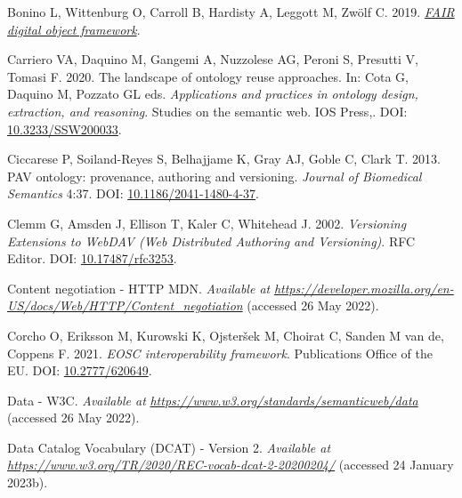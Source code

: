\begin{CSLReferences}{1}{0}
\leavevmode{}%
Bonino L, Wittenburg O, Carroll B, Hardisty A, Leggott M, Zwölf C. 2019. \emph{\href{https://github.com/GEDE-RDA-Europe/GEDE/blob/master/FAIR\%20Digital\%20Objects/FDOF/FAIR\%20Digital\%20Object\%20Framework-v1-02.docx}{FAIR digital object framework}}.

\leavevmode{}%
Carriero VA, Daquino M, Gangemi A, Nuzzolese AG, Peroni S, Presutti V, Tomasi F. 2020. The landscape of ontology reuse approaches. In: Cota G, Daquino M, Pozzato GL eds. \emph{Applications and practices in ontology design, extraction, and reasoning}. Studies on the semantic web. IOS Press,. DOI: \href{https://doi.org/10.3233/SSW200033}{10.3233/SSW200033}.

\leavevmode{}%
Ciccarese P, Soiland-Reyes S, Belhajjame K, Gray AJ, Goble C, Clark T. 2013. PAV ontology: provenance, authoring and versioning. \emph{Journal of Biomedical Semantics} 4:37. DOI: \href{https://doi.org/10.1186/2041-1480-4-37}{10.1186/2041-1480-4-37}.

\leavevmode{}%
Clemm G, Amsden J, Ellison T, Kaler C, Whitehead J. 2002. \emph{Versioning Extensions to WebDAV (Web Distributed Authoring and Versioning)}. RFC Editor. DOI: \href{https://doi.org/10.17487/rfc3253}{10.17487/rfc3253}.

\leavevmode{}%
Content negotiation - HTTP \textbar{} MDN. \emph{Available at} \href{https://developer.mozilla.org/en-US/docs/Web/HTTP/Content_negotiation}{\emph{https://developer.mozilla.org/en-US/docs/Web/HTTP/Content\_negotiation}} (accessed 26 May 2022).

\leavevmode{}%
Corcho O, Eriksson M, Kurowski K, Ojsteršek M, Choirat C, Sanden M van de, Coppens F. 2021. \emph{EOSC interoperability framework}. Publications Office of the EU. DOI: \href{https://doi.org/10.2777/620649}{10.2777/620649}.

\leavevmode{}%
Data - W3C. \emph{Available at} \href{https://www.w3.org/standards/semanticweb/data}{\emph{https://www.w3.org/standards/semanticweb/data}} (accessed 26 May 2022).

\leavevmode{}%
Data Catalog Vocabulary (DCAT) - Version 2. \emph{Available at} \href{https://www.w3.org/TR/2020/REC-vocab-dcat-2-20200204/}{\emph{https://www.w3.org/TR/2020/REC-vocab-dcat-2-20200204/}} (accessed 24 January 2023b).


\end{CSLReferences}
